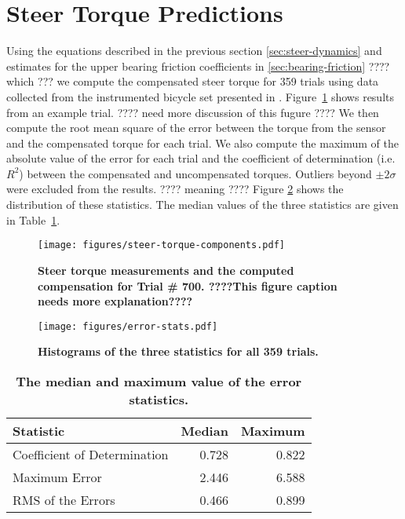 \documentclass[10pt]{article}
\begin{document}

\section*{Steer Torque Predictions}

Using the equations described in the previous section \ref{sec:steer-dynamics} and 
estimates for the upper bearing friction coefficients in
\ref{sec:bearing-friction} ???? which ??? we compute the compensated steer torque for 359
trials using data collected from the instrumented bicycle set presented in
\cite{Moore2012}. Figure~\ref{fig:steer-torque-components} shows results from
an example trial. ???? need more discussion of this fugure ????
We then compute the root mean square of the error between
the torque from the sensor and the compensated torque for each trial. We also
compute the maximum of the absolute value of the error for each trial and the
coefficient of determination (i.e. $R^2$) between the compensated and
uncompensated torques. Outliers beyond $\pm2 \sigma$ were excluded from
the results. ???? meaning ???? Figure \ref{fig:error-stats} shows the distribution of these
statistics. The median values of the three statistics are given in
Table~\ref{tab:medians}.

\begin{figure}
  \centering
  \texttt{[image: figures/steer-torque-components.pdf]}
  \caption{{\bf Steer torque measurements and the computed compensation for Trial \#
    700.  ????This figure caption needs more explanation????}}
  \label{fig:steer-torque-components}
\end{figure}

\begin{figure}
  \centering
  \texttt{[image: figures/error-stats.pdf]}
  \caption{{\bf Histograms of the three statistics for all 359 trials.}}
  \label{fig:error-stats}
\end{figure}

\begin{table}
  \caption{{\bf The median and maximum value of the error statistics.}}
  \centering
  \begin{tabular}{lrr}
    \hline
    Statistic                    & Median   & Maximum \\
    \hline
    Coefficient of Determination & 0.728 & 0.822 \\
    Maximum Error                & 2.446 & 6.588 \\
    RMS of the Errors            & 0.466 & 0.899
  \end{tabular}
  \label{tab:medians}
\end{table}
\end{document}
